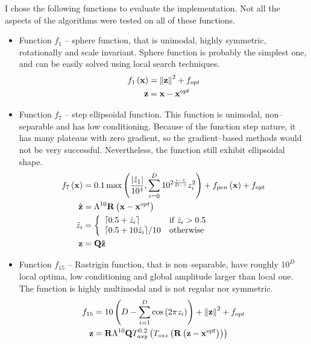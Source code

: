 I chose the following functions to evaluate the implementation. Not all the aspects of the algorithms were tested on all of these functions.
\begin{itemize}
    \item Function $f_1$ -- sphere function, that is unimodal, highly symmetric, rotationally and scale invariant. Sphere function is probably the simplest one, and can be easily solved using local search techniques.
    \begin{align*}
        f_{1}\left(\mathbf{x}\right) &= \left\lVert\mathbf{z}\right\rVert^2+f_{opt} \\
        \mathbf{z} &= \mathbf{x} - \mathbf{x}^{opt}
    \end{align*}
    \item Function $f_7$ -- step ellipsoidal function. This function is unimodal, non--separable and has low conditioning. Because of the function step nature, it has many plateaus with zero gradient, so the gradient--based methods would not be very successful. Nevertheless, the function still exhibit ellipsoidal shape. 
    \begin{align*}
        f_{7}\left(\mathbf{x}\right) &= 0.1\max\left( \frac{\abs{\hat{z}_1}}{10^4}, \sum_{i=0}^D 10^{2\frac{i-1}{D-i}}z_i^2 \right) + f_{pen}\left( \mathbf{x} \right)+f_{opt} \\
        \hat{\mathbf{z}} &= \Lambda^{10}\mathbf{R} \left( \mathbf{x} - \mathbf{x}^{opt} \right) \\
        \tilde{z}_i &=\left\{ 
            \begin{array}{ll}
                \lceil 0.5 + \hat{z}_i \rceil       & \text{if}\ \hat{z}_i>0.5 \\
                \lceil 0.5 + 10\hat{z}_i\rceil / 10 & \text{otherwise}        \\
            \end{array}  
            \right. \\
        \mathbf{z} &= \mathbf{Q}\mathbf{\tilde{z}} 
    \end{align*}
    \item Function $f_{15}$ -- Rastrigin function, that is non--separable, have roughly $10^D$ local optima, low conditioning and global amplitude larger than local one. The function is highly multimodal and is not regular nor symmetric.
    \begin{align*}
        f_{15} &= 10\left( D-\sum_{i=1}^D \cos\left(2 \pi z_i\right) \right) + \norm{\mathbf{z}}^2+f_{opt} \\
        \mathbf{z} &= \mathbf{R}\Lambda^{10}\mathbf{Q}T_{asy}^{0.2} \left( T_{osz}\left(\mathbf{R}\left(\mathbf{z}-\mathbf{x}^{opt}\right)\right) \right)

\end{align*}
\end{itemize}
